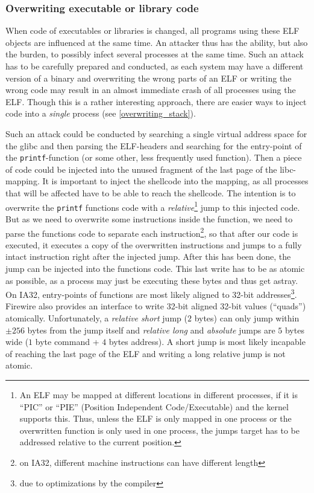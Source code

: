\subsubsection{Overwriting executable or library code}

When code of executables or libraries is changed, all programs using these ELF
objects are influenced at the same time. An attacker thus has the ability, but
also the burden, to possibly infect several processes at the same time. Such an
attack has to be carefully prepared and conducted, as each system may have a
different version of a binary and overwriting the wrong parts of an ELF or
writing the wrong code may result in an almost immediate crash of all processes
using the ELF. Though this is a rather interesting approach, there are easier
ways to inject code into a \emph{single} process (see \ref{overwriting_stack}).

Such an attack could be conducted by searching a single virtual address space
for the glibc and then parsing the ELF-headers and searching for the entry-point
of the \texttt{printf}-function (or some other, less frequently used function).
Then a piece of code could be injected into the unused fragment of the last page
of the libc-mapping. It is important to inject the shellcode into the mapping,
as all processes that will be affected have to be able to reach the shellcode.
The intention is to overwrite the \texttt{printf} functions code with a
\emph{relative}\footnote{An ELF may be mapped at different locations in
different processes, if it is ``PIC'' or ``PIE'' (Position Independent
Code/Executable) and the kernel supports this.  Thus, unless the ELF is only
mapped in one process or the overwritten function is only used in one process,
the jumps target has to be addressed relative to the current position.} jump to
this injected code.  But as we need to overwrite some instructions inside the
function, we need to parse the functions code to separate each
instruction\footnote{on IA32, different machine instructions can have different
length}, so that after our code is executed, it executes a copy of the
overwritten instructions and jumps to a fully intact instruction right after the
injected jump. After this has been done, the jump can be injected into the
functions code. This last write has to be as atomic as possible, as a process
may just be executing these bytes and thus get astray.  On IA32, entry-points of
functions are most likely aligned to 32-bit addresses\footnote{due to
optimizations by the compiler}.  Firewire also provides an interface to write
32-bit aligned 32-bit values (``quads'') atomically.  Unfortunately, a
\emph{relative short} jump ($2$ bytes) can only jump within $\pm256$ bytes from
the jump itself and \emph{relative long} and \emph{absolute} jumps are $5$ bytes
wide ($1$ byte command + $4$ bytes address).  A short jump is most likely
incapable of reaching the last page of the ELF and writing a long relative jump
is not atomic.

